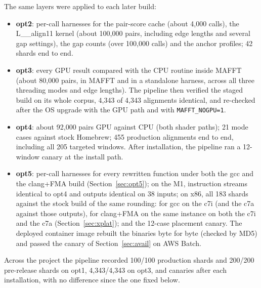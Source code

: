 \documentclass[11pt]{article}
\newcommand{\code}[1]{\texttt{#1}}
\begin{document}
The same layers were applied to each later build:
\begin{itemize}
\item \textbf{opt2}: per-call harnesses for the pair-score cache (about 4{,}000 calls), the
  L\_\_align11 kernel (about 100{,}000 pairs, including edge lengths and several gap
  settings), the gap counts (over 100{,}000 calls) and the anchor profiles; 42 shards end to end.
\item \textbf{opt3}: every GPU result compared with the CPU routine inside MAFFT (about 80{,}000
  pairs, in MAFFT and in a standalone harness, across all three threading modes and edge lengths). The pipeline then verified the
  staged build on its whole corpus, 4{,}343 of 4{,}343 alignments identical, and re-checked
  after the OS upgrade with the GPU path and with \code{MAFFT\_NOGPU=1}.
\item \textbf{opt4}: about 92{,}000 pairs GPU against CPU (both shader paths); 21 mode cases
  against stock Homebrew; 455 production alignments end to end, including all 205 targeted
  windows. After installation, the pipeline ran a 12-window canary at the install path.
\item \textbf{opt5}: per-call harnesses for every rewritten function under both the gcc and the
  clang+FMA build (Section~\ref{sec:opt5}); on the M1, instruction streams identical to opt4
  and outputs identical on 38 inputs; on x86, all 183 shards against the stock build of the
  same rounding: for gcc on the c7i (and the c7a against those outputs), for clang+FMA on the
  same instance on both the c7i and the c7a (Section~\ref{sec:xplat}); and the 12-case
  placement canary. The deployed container image rebuilt the binaries byte for byte (checked by MD5)
  and passed the canary of Section~\ref{sec:avail} on AWS Batch.
\end{itemize}

Across the project the pipeline recorded 100/100 production shards and 200/200 pre-release
shards on opt1, 4{,}343/4{,}343 on opt3, and canaries after each installation, with no
difference since the one fixed below.
\end{document}
